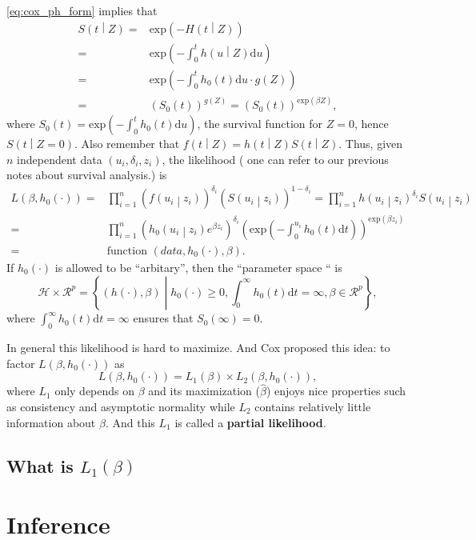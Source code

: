 \documentclass[a4paper,12pt]{article}
\begin{document}
\eqref{eq:cox_ph_form} implies that
\[
  \begin{aligned}
    S\left(t\middle|Z\right)
    =& \mathrm{exp}\left(-H\left(t\middle|Z\right)\right)    \\
    =& \mathrm{exp}\left(-\int_0^th\left(u\middle|Z\right)\mathrm{d}u\right)    \\
    =& \mathrm{exp}\left(-\int_0^th_0\left(t\right)\mathrm{d}u \cdot g\left(Z\right)\right)    \\
    =& \left(S_0\left(t\right)\right)^{g\left(Z\right)}
    = \left(S_0\left(t\right)\right)^{\mathrm{exp}\left(\beta Z\right)}
    ,
  \end{aligned}
\]
where $S_0\left(t\right) = \mathrm{exp}\left( - \int_0^t h_0\left(t\right)\mathrm{d}u\right)$, the survival function for $Z = 0$, hence $S\left(t\middle|Z = 0\right)$. Also remember that $f\left(t\middle|Z\right) = h\left(t\middle|Z\right) S\left(t\middle|Z\right)$. Thus, given $n$ independent data $\left(u_i, \delta_i, z_i\right)$, the likelihood ({\color{blue} one can refer to our previous notes about survival analysis.}) is
\[
  \begin{aligned}
    L\left(\beta, h_0\left(\cdot\right)\right)
    =& \prod\limits_{i = 1}^n
    \left(
      f\left(u_i\middle|z_i\right)
    \right)^{\delta_i}
    \left(
      S\left(u_i\middle|z_i\right)
    \right)^{1 - \delta_i}
    = \prod\limits_{i = 1}^n
    h\left(u_i\middle|z_i\right)^{\delta_i}
    S\left(u_i\middle|z_i\right)    \\
    =& \prod\limits_{i = 1}^n
    \left(
      h_0\left(u_i\middle|z_i\right)
      e^{\beta z_i}
    \right)^{\delta_i}
    \left(
      \mathrm{exp}\left(-\int_0^{u_i}h_0\left(t\right)\mathrm{d}t\right)
    \right)^{\mathrm{exp}\left(\beta z_i\right)}    \\
    =& \text{function $\left(data, h_0\left(\cdot\right), \beta\right)$}.
  \end{aligned}
\]
If $h_0\left(\cdot\right)$ is allowed to be ``arbitary'', then the ``parameter space `` is
\[
  \mathcal{H} \times \mathcal{R}^p
  = \left\{
    \left(h\left(\cdot\right), \beta\right)
    \middle|
    h_0\left(\cdot\right) \geq 0,
    \int_0^\infty h_0\left(t\right)\mathrm{d}t = \infty,
    \beta \in \mathcal{R}^p
  \right\}
  ,
\]
where $\int_0^\infty h_0\left(t\right)\mathrm{d}t = \infty$ ensures that $S_0\left(\infty\right) = 0$.
\par
In general this likelihood is hard to maximize. And Cox proposed this idea: to factor $L\left(\beta, h_0\left(\cdot\right)\right)$ as
\[
  L\left(\beta, h_0\left(\cdot\right)\right)
  = L_1\left(\beta\right)
  \times
  L_2\left(\beta, h_0\left(\cdot\right)\right)
  ,
\]
where $L_1$ only depends on $\beta$ and its maximization ($\hat{\beta}$) enjoys nice properties such as consistency and asymptotic normality while $L_2$ contains relatively little information about $\beta$. And this $L_1$ is called a \textbf{partial likelihood}.

\subsection{What is $L_1\left(\beta\right)$}
\label{sec:what-is}


\section{Inference}
\label{sec:inference}







\end{document}
